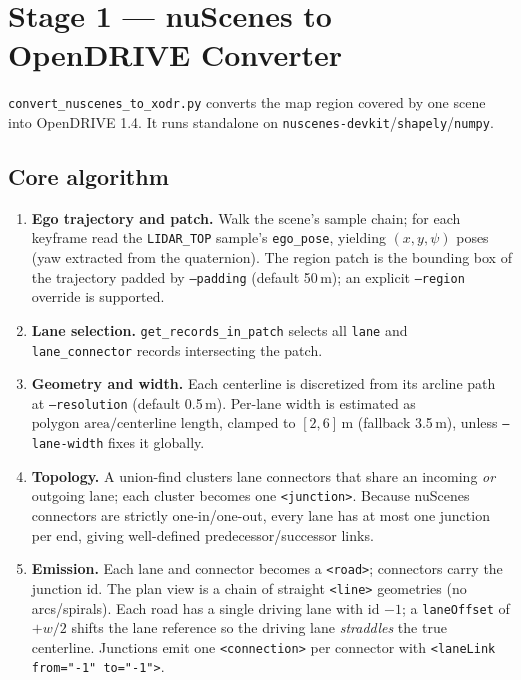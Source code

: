 \documentclass[11pt]{article}
\newcommand{\code}[1]{{\setlength{\fboxsep}{1.5pt}\colorbox{codegray}{\small\texttt{#1}}}}
\newcommand{\file}[1]{\texttt{#1}}
\begin{document}
\section{Stage 1 --- nuScenes to OpenDRIVE Converter}
\label{sec:converter}

\file{convert\_nuscenes\_to\_xodr.py} converts the map region covered by one scene into
OpenDRIVE 1.4. It runs standalone on \file{nuscenes-devkit}/\file{shapely}/\file{numpy}.

\subsection{Core algorithm}
\begin{enumerate}
\item \textbf{Ego trajectory and patch.} Walk the scene's sample chain; for each
      keyframe read the \code{LIDAR\_TOP} sample's \code{ego\_pose}, yielding
      $(x, y, \psi)$ poses (yaw extracted from the quaternion). The region patch is the
      bounding box of the trajectory padded by \code{--padding} (default 50\,m); an
      explicit \code{--region} override is supported.
\item \textbf{Lane selection.} \code{get\_records\_in\_patch} selects all \code{lane}
      and \code{lane\_connector} records intersecting the patch.
\item \textbf{Geometry and width.} Each centerline is discretized from its arcline path
      at \code{--resolution} (default 0.5\,m). Per-lane width is estimated as
      $\text{polygon area} / \text{centerline length}$, clamped to $[2, 6]$\,m
      (fallback 3.5\,m), unless \code{--lane-width} fixes it globally.
\item \textbf{Topology.} A union-find clusters lane connectors that share an incoming
      \emph{or} outgoing lane; each cluster becomes one \code{<junction>}. Because
      nuScenes connectors are strictly one-in/one-out, every lane has at most one
      junction per end, giving well-defined predecessor/successor links.
\item \textbf{Emission.} Each lane and connector becomes a \code{<road>}; connectors
      carry the junction id. The plan view is a chain of straight \code{<line>}
      geometries (no arcs/spirals). Each road has a single driving lane with id $-1$;
      a \code{laneOffset} of $+w/2$ shifts the lane reference so the driving lane
      \emph{straddles} the true centerline. Junctions emit one \code{<connection>} per
      connector with \code{<laneLink from="-1" to="-1">}.
\end{enumerate}
\end{document}
